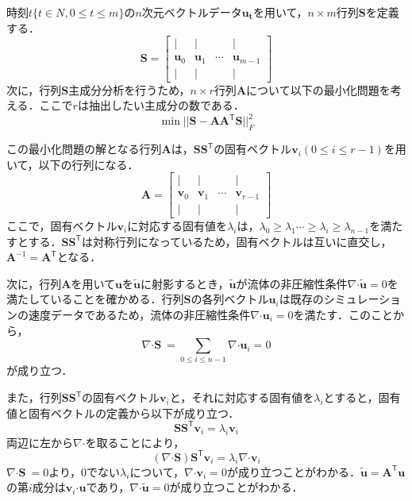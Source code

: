 \documentclass[a4j,12pt]{jreport}
\begin{document}
	時刻$t \{t \in N, 0 \le t \le m\}$の$n$次元ベクトルデータ$\bm{u_t}$を用いて，$n\times m$行列$\bm{S}$を定義する．
		 \[ \bm{S} = 
        		\begin{bmatrix}
   | & | &  & |\\
   \bm{u}_0 & \bm{u}_1 &\cdots  & \bm{u}_{m-1} \\
   | & | &  & |
\end{bmatrix}
\]
次に，行列$\bm{S}$主成分分析を行うため，$n \times r$行列$\bm{A}$について以下の最小化問題を考える．ここで$r$は抽出したい主成分の数である．
\[
\min || \bm{S} -  \bm{A}\bm{A}^{\mathsf T} \bm{S}||^2_F
\]


この最小化問題の解となる行列$\bm{A}$は，$\bm{S}\bm{S}^{\mathsf T}$の固有ベクトル$\bm{v}_i(0 \le i \le r-1)$を用いて，以下の行列になる．
 \[ 
 \bm{A}  = 
        		\begin{bmatrix}
   | & | &  & |\\
   \bm{v}_0 & \bm{v}_1 &\cdots  & \bm{v}_{r-1} \\
   | & | &  & |
\end{bmatrix}
\]
ここで，固有ベクトル$\bm{v}_i$に対応する固有値を$\lambda_i$は，$\lambda_0 \ge \lambda_1 \cdots \ge \lambda_i \ge \lambda_{n-1} $を満たすとする．$\bm{S}\bm{S}^{\mathsf T}$は対称行列になっているため，固有ベクトルは互いに直交し，$\bm{A}^{-1} = \bm{A}^{\mathsf T}$となる．%

次に，行列$\bm{A}$を用いて$\bm{u}$を$\bm{\widetilde{u}}$に射影するとき，$\bm{\widetilde{u}}$が流体の非圧縮性条件$\nabla\boldsymbol{\cdot}\bm{\widetilde{u}} = 0$を満たしていることを確かめる．行列$\bm{S}$の各列ベクトル$\bm{u}_i$は既存のシミュレーションの速度データであるため，流体の非圧縮性条件$\nabla\boldsymbol{\cdot}\bm{u}_i = 0$を満たす．このことから，
\[
	\nabla\boldsymbol{\cdot}\bm{S}\ = \sum_{0 \le i \le n-1}\nabla\boldsymbol{\cdot}\bm{u}_i = 0
\]
が成り立つ．

また，行列$\bm{S}\bm{S}^{\mathsf T}$の固有ベクトル$\bm{v}_i$と，それに対応する固有値を$\lambda_i$とすると，固有値と固有ベクトルの定義から以下が成り立つ．
\[
	\bm{S}\bm{S}^{\mathsf T}\bm{v}_i = \lambda_i\bm{v}_i
\]
両辺に左から$\nabla\boldsymbol{\cdot}$を取ることにより，
\[
	(\nabla\boldsymbol{\cdot}\bm{S})\bm{S}^{\mathsf T}\bm{v}_i = \lambda_i\nabla\boldsymbol{\cdot}\bm{v}_i
\]
$\nabla\boldsymbol{\cdot}\bm{S}\ = 0$より，0でない$ \lambda_i$について，$\nabla\boldsymbol{\cdot}\bm{v}_i = 0$が成り立つことがわかる．$\bm{\widetilde{u}} = \bm{A}^{\mathsf T}\bm{u}$の第$i$成分は$\bm{v}_i\boldsymbol{\cdot}\bm{u}$であり，$\nabla\boldsymbol{\cdot}\bm{\widetilde{u}} =  0$が成り立つことがわかる．
\end{document}
